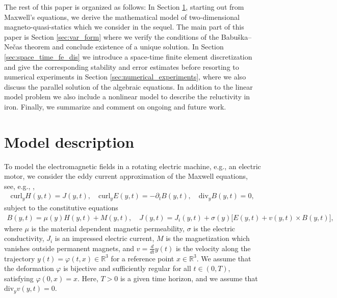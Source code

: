 \documentclass[12pt]{article}
\numberwithin{equation}{section}
\begin{document}
The rest of this paper is organized as follows:
In Section \ref{sec:model_descr}, starting out from Maxwell's equations,
we derive the mathematical model of two-dimensional magneto-quasi-statics
which we consider in the sequel. The main part of this paper is
Section \ref{sec:var_form} where we verify the conditions of the
Babu\v ska--Ne\v cas theorem and conclude existence of a unique solution.
In Section \ref{sec:space_time_fe_dis} we introduce a space-time finite
element discretization and give the corresponding stability and error
estimates before resorting to numerical experiments in
Section \ref{sec:numerical_experiments}, where we also discuss the
parallel solution of the algebraic equations. In addition to the linear
model problem we also include a nonlinear model to describe the reluctivity
in iron. Finally, we summarize and comment on ongoing and future work.




\section{Model description}\label{sec:model_descr}
To model the electromagnetic fields in a rotating
electric machine, e.g., an electric motor, we consider the eddy current
approximation of the Maxwell equations, see, e.g., \cite{LaPaRe19},
\begin{align}\label{eqn:maxwell}
  \text{curl}_y H(y,t) = J(y,t), \quad
  \text{curl}_y E(y,t) = - \partial_t B(y,t), \quad
  \text{div}_y B(y,t) = 0,
\end{align}
subject to the constitutive equations
\begin{align}
\label{eqn:constitutive}
  B(y,t) = \mu(y)H(y,t) + M(y,t), \quad
  J(y,t) = J_i(y,t) + \sigma(y) \Big[E(y,t) + v(y,t) \times B(y,t) \Big],
\end{align}
where $\mu$ is the material dependent magnetic permeability, $\sigma$ is the
electric conductivity, $J_i$ is an impressed electric current, $M$ is the
magnetization which vanishes outside permanent magnets, and
$v=\frac{d}{dt}y(t)$ is the velocity along the trajectory
$y(t)=\varphi(t,x) \in {\mathbb{R}}^3$ for a reference point
$x \in {\mathbb{R}}^3$.
We assume that the deformation $\varphi$ is bijective and sufficiently
regular for all $t \in (0,T)$, satisfying $\varphi(0,x)=x$.
Here, $T > 0$ is a given time horizon, and we assume that
$\text{div}_y v(y,t) = 0$.
\end{document}
